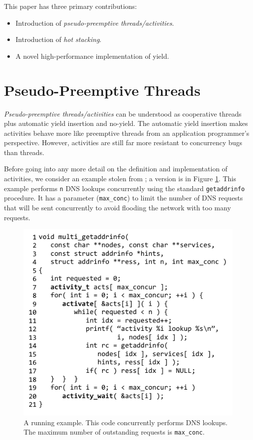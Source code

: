 \documentclass[pldi,10pt,preprint]{sigplanconf-pldi16}
\begin{document}
This paper has three primary contributions:

\begin{itemize}
\item Introduction of \emph{pseudo-preemptive threads/activities}.
\item Introduction of \emph{hot stacking}.
\item A novel high-performance implementation of yield.
\end{itemize}

\section{Pseudo-Preemptive Threads}

\emph{Pseudo-preemptive threads\slash activities} can be understood as cooperative threads plus automatic yield insertion and no-yield.
The automatic yield insertion makes activities behave more like preemptive threads from an application programmer's perspective.
However, activities are still far more resistant to concurrency bugs than threads.

Before going into any more detail on the definition and implementation of activities, we consider an example stolen from \cite{Krohn2007}; a \charcoal{} version is in Figure \ref{fig:charcoal_multidns}.
This example performs \texttt{n} DNS lookups concurrently using the standard \texttt{getaddrinfo} procedure.
It has a parameter (\texttt{max\_conc}) to limit the number of DNS requests that will be sent concurrently to avoid flooding the network with too many requests.

\begin{figure}
\includegraphics{multi_getaddrinfo}
\caption{A running example.
  This code concurrently performs DNS lookups.
  The maximum number of outstanding requests is \texttt{max\_conc}.}
\label{fig:charcoal_multidns}
\end{figure}
\end{document}
